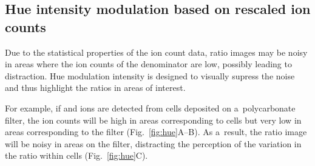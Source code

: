 \subsection{Hue intensity modulation based on rescaled ion counts}
\setcounter{step}{0}

\goldbox{}
Due to the statistical properties of the ion count data, ratio images may be noisy in areas where the ion counts of the denominator are low, possibly leading to distraction. Hue modulation intensity is designed to visually supress the noise and thus highlight the ratios in areas of interest. 
\tcbe

For example, if  and  ions are detected from cells deposited on a~polycarbonate filter, the ion counts will be high in areas corresponding to cells but very low in areas corresponding to the filter (Fig.~\ref{fig:hue}A--B). As a~result, the ratio image  will be noisy in areas on the filter, distracting the perception of the variation in the  ratio within cells (Fig.~\ref{fig:hue}C). 


